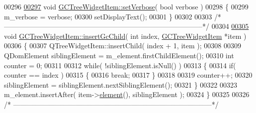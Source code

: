 \begin{DoxyCode}
00296 
\hypertarget{gctreewidgetitem_8cpp_source_l00297}{}\hyperlink{class_g_c_tree_widget_item_a557b0034fd98a444a7173d76a6320f4c}{00297} \textcolor{keywordtype}{void} \hyperlink{class_g_c_tree_widget_item_a557b0034fd98a444a7173d76a6320f4c}{GCTreeWidgetItem::setVerbose}( \textcolor{keywordtype}{bool} verbose )
00298 \{
00299   m\_verbose = verbose;
00300   setDisplayText();
00301 \}
00302 
00303 \textcolor{comment}{/*
      --------------------------------------------------------------------------------------*/}
00304 
\hypertarget{gctreewidgetitem_8cpp_source_l00305}{}\hyperlink{class_g_c_tree_widget_item_a197806cd712ae04b129acd1699674df5}{00305} \textcolor{keywordtype}{void} \hyperlink{class_g_c_tree_widget_item_a197806cd712ae04b129acd1699674df5}{GCTreeWidgetItem::insertGcChild}( \textcolor{keywordtype}{int} index, \hyperlink{class_g_c_tree_widget_item}{GCTreeWidgetItem} *item )
00306 \{
00307   QTreeWidgetItem::insertChild( index + 1, item );
00308 
00309   QDomElement siblingElement = m\_element.firstChildElement();
00310   \textcolor{keywordtype}{int} counter = 0;
00311 
00312   \textcolor{keywordflow}{while}( !siblingElement.isNull() )
00313   \{
00314     \textcolor{keywordflow}{if}( counter == index )
00315     \{
00316       \textcolor{keywordflow}{break};
00317     \}
00318 
00319     counter++;
00320     siblingElement = siblingElement.nextSiblingElement();
00321   \}
00322 
00323   m\_element.insertAfter( item->\hyperlink{class_g_c_tree_widget_item_a584cad866bdbd94710d31eb77b804d84}{element}(), siblingElement );
00324 \}
00325 
00326 \textcolor{comment}{/*
      --------------------------------------------------------------------------------------*/}
\end{DoxyCode}
